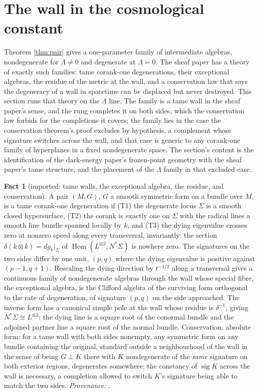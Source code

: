\documentclass[11pt]{article}
\theoremstyle{definition}
\newtheorem{fact}[theorem]{Fact}
\begin{document}
\section{The wall in the cosmological constant}\label{sec:lambdawall}

Theorem \ref{thm:pair} gives a one-parameter family of intermediate algebras, nondegenerate for $\Lambda \neq 0$ and degenerate at $\Lambda = 0$. The sheaf paper has a theory of exactly such families: tame corank-one degenerations, their exceptional algebras, the residue of the metric at the wall, and a conservation law that says the degeneracy of a wall in spacetime can be displaced but never destroyed. This section runs that theory on the $\Lambda$ line. The family is a tame wall in the sheaf paper's sense, and the rung completes it on both sides, which the conservation law forbids for the completions it covers; the family lies in the case the conservation theorem's proof excludes by hypothesis, a complement whose signature switches across the wall, and that case is generic to any corank-one family of hyperplanes in a fixed nondegenerate space. The section's content is the identification of the dark-energy paper's frozen-point geometry with the sheaf paper's tame structure, and the placement of the $\Lambda$ family in that excluded case.

\begin{fact}[imported: tame walls, the exceptional algebra, the residue, and conservation]\label{fact:t4}
A pair $(M,G)$, $G$ a smooth symmetric form on a bundle over $M$, is a tame corank-one degeneration if (T1) the degenerate locus $\Sigma$ is a smooth closed hypersurface, (T2) the corank is exactly one on $\Sigma$ with the radical lines a smooth line bundle spanned locally by $k$, and (T3) the dying eigenvalue crosses zero at nonzero speed along every transversal, invariantly: the section $\delta(k \otimes k) = dg_{k}|_{\Sigma}$ of $\operatorname{Hom}(L^{\otimes 2}, N^{*}\Sigma)$ is nowhere zero. The signatures on the two sides differ by one unit, $(p,q)$ where the dying eigenvalue is positive against $(p-1, q+1)$. Rescaling the dying direction by $t^{-1/2}$ along a transversal gives a continuous family of nondegenerate algebras through the wall whose special fibre, the exceptional algebra, is the Clifford algebra of the surviving form orthogonal to the rate of degeneration, of signature $(p,q)$ on the side approached. The inverse form has a canonical simple pole at the wall whose residue is $\delta^{-1}$, giving $N^{*}\Sigma \cong L^{\otimes 2}$: the dying line is a square root of the conormal bundle and the adjoined partner line a square root of the normal bundle. Conservation, absolute form: for a tame wall with both sides nonempty, any symmetric form on any bundle containing the original, standard outside a neighbourhood of the wall in the sense of being $G \perp K$ there with $K$ nondegenerate of the \emph{same} signature on both exterior regions, degenerates somewhere; the constancy of $\operatorname{sig} K$ across the wall is necessary, a completion allowed to switch $K$'s signature being able to match the two sides. \emph{Provenance:} \cite[Hyp.~2.1, Lem.~2.2, Rem.~2.3, Prop.~6.1, Thm.~6.2, Thm.~5.1]{ButlerT4}.
\end{fact}
\end{document}
